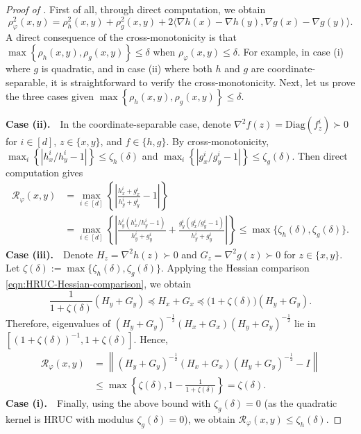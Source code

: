 \documentclass[10pt,a4paper]{amsart}
\newcommand{\cR}{\mathcal{R}}
\begin{document}
\begin{proof}[Proof of ] First of all, through direct computation, we obtain 
\begin{equation*} 
\rho_\varphi^2(x,y) = \rho_h^2(x,y) + \rho_g^2(x,y) + 2\langle \nabla h(x)-\nabla h(y),  \nabla g(x)-\nabla g(y)\rangle. \end{equation*}
A direct consequence of the cross-monotonicity is that $\max\left\{\rho_h(x,y),\rho_g(x,y)\right\}\leq \delta$ when $\rho_\varphi(x,y)\leq\delta$. For example, in case (i) where $g$ is quadratic, and in case (ii) where both $h$ and $g$ are coordinate-separable, it is straightforward to verify the cross-monotonicity. Next, let us prove the three cases given $\max\left\{\rho_h(x,y),\rho_g(x,y)\right\}\leq \delta$.\vspace{0.1cm} 

\noindent\textbf{Case (ii).} $\,\,$ In the coordinate-separable case, denote $\nabla^2f(z) = \mathrm{Diag}(f_z^i)\succ0$ for $i\in[d]$, $z\in\{x,y\}$, and $f\in\{h,g\}$.  By cross-monotonicity,   
$\max_i\left\{\left|h_x^i/h_y^i-1\right|\right\}\leq \zeta_h(\delta)$ and  $\max_i\left\{\left|g_x^i/g_y^i-1\right|\right\}\leq \zeta_g(\delta)$. Then direct computation gives
\begin{equation*}
\begin{aligned}
     \cR_\varphi(x,y) &= \max_{i\in[d]}\left\{\left|\frac{h_x^i+g_x^i}{h_y^i+g_y^i}-1\right|\right\}  \\&= \max_{i\in[d]}\left\{\left|\frac{h_y^i(h_x^i/h_y^i-1)}{h_y^i+g_y^i}+\frac{g_y^i(g_x^i/g_y^i-1)}{h_y^i+g_y^i}\right|\right\} \leq \max\{\zeta_h(\delta),\zeta_g(\delta)\}.
\end{aligned}   
\end{equation*}
\noindent\textbf{Case (iii).} $\,\,$ Denote $H_z = \nabla^2h(z)\succ0$ and $G_z = \nabla^2g(z)\succ0$ for $z\in\{x,y\}$. Let $\zeta(\delta):=\max\{\zeta_h(\delta),\zeta_g(\delta)\}$. Applying the Hessian comparison \eqref{eqn:HRUC-Hessian-comparison}, we obtain
\begin{equation*}
\frac{1}{1+\zeta(\delta)}(H_y+G_y)
\preceq H_x+G_x
\preceq\big(1+\zeta(\delta)\big)(H_y+G_y).
\end{equation*}
Therefore, eigenvalues of $(H_y+G_y)^{-\frac12}(H_x+G_x)(H_y+G_y)^{-\frac12}$ lie in $[(1+\zeta(\delta))^{-1},1+\zeta(\delta)]$. Hence,
\begin{equation*}
\begin{aligned}
     \cR_\varphi(x,y)
     &=\left\|(H_y+G_y)^{-\frac12}(H_x+G_x)(H_y+G_y)^{-\frac12}-I\right\|\\
     &\leq \max\left\{\zeta(\delta),1-\frac{1}{1+\zeta(\delta)}\right\}
     =\zeta(\delta).
\end{aligned}
\end{equation*}
\noindent\textbf{Case (i).} $\,\,$ Finally, using the above bound with $\zeta_g(\delta)=0$ (as the quadratic kernel is HRUC with modulus $\zeta_g(\delta)=0$), we obtain $\cR_\varphi(x,y)\leq \zeta_h(\delta)$.
\end{proof}
\end{document}
